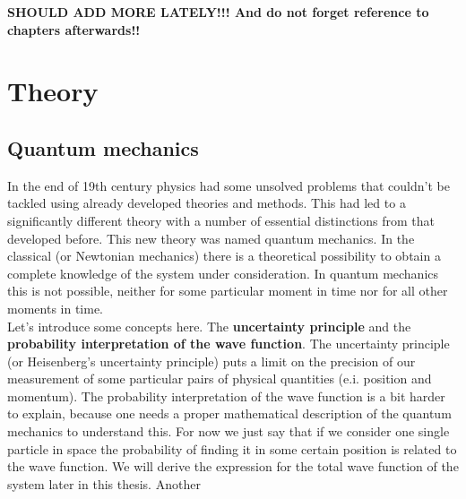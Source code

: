 \documentclass[twoside,english]{uiofysmaster}
\theoremstyle{definition}
\begin{document}
\textbf{	SHOULD ADD MORE LATELY!!! And do not forget reference to chapters afterwards!!}
	
\part{Theory}
\chapter{Quantum mechanics}
In the end of 19th century physics had some unsolved problems that couldn't be tackled using already developed theories and methods. This had led to a  significantly different theory with a number of essential distinctions  from that developed before. This new theory was named quantum mechanics. In the classical (or Newtonian mechanics) there is a theoretical possibility to obtain a complete knowledge of the system under consideration. In quantum mechanics this is not possible, neither for some particular moment in time  nor for all other  moments in time. \\
Let's introduce some concepts here. The \textbf{uncertainty principle} and the \textbf{probability interpretation of the wave function}. The  uncertainty principle (or Heisenberg's uncertainty principle) puts a limit on the precision of our measurement of some particular pairs of physical quantities (e.i. position and momentum). The probability interpretation of the wave function is a bit harder to explain, because one needs a proper mathematical description of the quantum mechanics to understand this. For now we just say that if we consider one single particle in space the probability of finding it in some certain position is related to the wave function. We will derive the expression for the total wave function of the system later in this thesis. Another 
\end{document}

